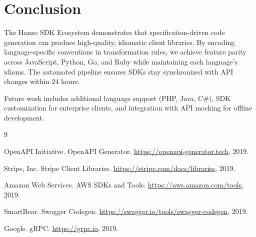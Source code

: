 \section{Conclusion}


The Hanzo SDK Ecosystem demonstrates that specification-driven code generation can produce high-quality, idiomatic client libraries. By encoding language-specific conventions in transformation rules, we achieve feature parity across JavaScript, Python, Go, and Ruby while maintaining each language's idioms. The automated pipeline ensures SDKs stay synchronized with API changes within 24 hours.

Future work includes additional language support (PHP, Java, C\#), SDK customization for enterprise clients, and integration with API mocking for offline development.


\begin{thebibliography}{9}

OpenAPI Initiative. OpenAPI Generator. \url{https://openapi-generator.tech}, 2019.

Stripe, Inc. Stripe Client Libraries. \url{https://stripe.com/docs/libraries}, 2019.

Amazon Web Services. AWS SDKs and Tools. \url{https://aws.amazon.com/tools}, 2019.

SmartBear. Swagger Codegen. \url{https://swagger.io/tools/swagger-codegen}, 2019.

Google. gRPC. \url{https://grpc.io}, 2019.

\end{thebibliography}

